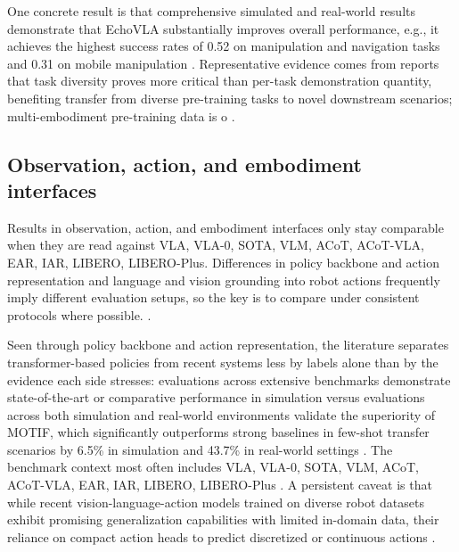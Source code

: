 \documentclass[a4paper,11pt]{article}
\begin{document}
One concrete result is that comprehensive simulated and real-world results demonstrate that EchoVLA substantially improves overall performance, e.g., it achieves the highest success rates of 0.52 on manipulation and navigation tasks and 0.31 on mobile manipulation \citep{Lin2025Echovla}. Representative evidence comes from reports that task diversity proves more critical than per-task demonstration quantity, benefiting transfer from diverse pre-training tasks to novel downstream scenarios; multi-embodiment pre-training data is o \citep{Shi2025Diversity}.

\subsection{Observation, action, and embodiment interfaces}


Results in observation, action, and embodiment interfaces only stay comparable when they are read against VLA, VLA-0, SOTA, VLM, ACoT, ACoT-VLA, EAR, IAR, LIBERO, LIBERO-Plus. Differences in policy backbone and action representation and language and vision grounding into robot actions frequently imply different evaluation setups, so the key is to compare under consistent protocols where possible. \citep{Duggan2026Price,Eze2024Learning,Fan2025Interleave,Gu2025Safe}.

Seen through policy backbone and action representation, the literature separates transformer-based policies from recent systems less by labels alone than by the evidence each side stresses: evaluations across extensive benchmarks demonstrate state-of-the-art or comparative performance in simulation versus evaluations across both simulation and real-world environments validate the superiority of MOTIF, which significantly outperforms strong baselines in few-shot transfer scenarios by 6.5\% in simulation and 43.7\% in real-world settings \citep{Zheng2025Soft,Hou2025Dita,Zhi2026Motif,Ye2026St4Vla}. The benchmark context most often includes VLA, VLA-0, SOTA, VLM, ACoT, ACoT-VLA, EAR, IAR, LIBERO, LIBERO-Plus \citep{Hou2025Dita,Zheng2025Soft,Zhong2026Acot,Torne2026Multi}. A persistent caveat is that while recent vision-language-action models trained on diverse robot datasets exhibit promising generalization capabilities with limited in-domain data, their reliance on compact action heads to predict discretized or continuous actions \citep{Hou2025Dita}.
\end{document}
